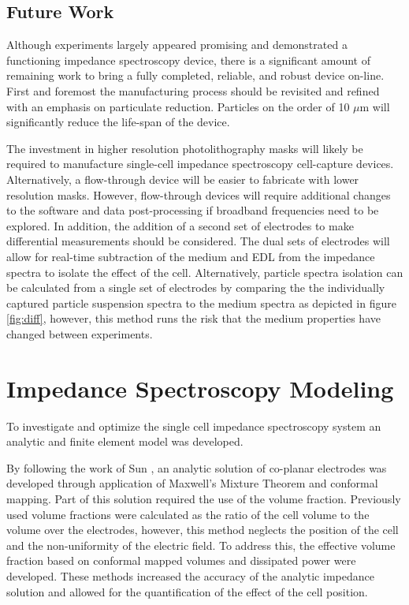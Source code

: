 \subsection*{Future Work}

\par Although experiments largely appeared promising and demonstrated a functioning impedance spectroscopy device, there is a significant amount of remaining work to bring a fully completed, reliable, and robust device on-line. First and foremost the manufacturing process should be revisited and refined with an emphasis on particulate reduction. Particles on the order of 10 $\mu$m will significantly reduce the life-span of the device. 

\par The investment in higher resolution photolithography masks will likely be required to manufacture single-cell impedance spectroscopy cell-capture devices. Alternatively, a flow-through device will be easier to fabricate with lower resolution masks. However, flow-through devices will require additional changes to the software and data post-processing if broadband frequencies need to be explored. In addition, the addition of a second set of electrodes to make differential measurements should be considered. The dual sets of electrodes will allow for real-time subtraction of the medium and EDL from the impedance spectra to isolate the effect of the cell. Alternatively, particle spectra isolation can be calculated from a single set of electrodes by comparing the the individually captured particle suspension spectra to the medium spectra as depicted in figure \ref{fig:diff}, however, this method runs the risk that the medium properties have changed between experiments.

\section{Impedance Spectroscopy Modeling}

\par To investigate and optimize the single cell impedance spectroscopy system an analytic and finite element model was developed. 

\par By following the work of Sun \cite{sun_analytical_2007}, an analytic solution of co-planar electrodes was developed through application of Maxwell's Mixture Theorem and conformal mapping. Part of this solution required the use of the volume fraction. Previously used volume fractions were calculated as the ratio of the cell volume to the volume over the electrodes, however, this method neglects the position of the cell and the non-uniformity of the electric field. To address this, the effective volume fraction based on conformal mapped volumes and dissipated power were developed. These methods increased the accuracy of the analytic impedance solution and allowed for the quantification of the effect of the cell position.

